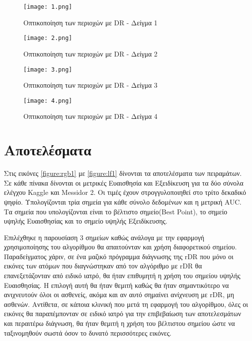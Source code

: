 

\begin{figure}[!h]
    \centering
      \texttt{[image: 1.png]} \caption{Οπτικοποίηση των περιοχών με DR - Δείγμα 1}
      \label{figure:viz1n}    
  \end{figure}

\begin{figure}[!h]
    \centering
      \texttt{[image: 2.png]} \caption{Οπτικοποίηση των περιοχών με DR - Δείγμα 2}
      \label{figure:viz2n}    
  \end{figure}

\begin{figure}[!h]
    \centering
      \texttt{[image: 3.png]} \caption{Οπτικοποίηση των περιοχών με DR - Δείγμα 3}
      \label{figure:viz3n}    
  \end{figure}

\begin{figure}[!h]
    \centering
      \texttt{[image: 4.png]} \caption{Οπτικοποίηση των περιοχών με DR - Δείγμα 4}
      \label{figure:viz4n}    
  \end{figure}

\section{Αποτελέσματα}
\label{sec:7.2}

Στις εικόνες \ref{figure:rgb1} με \ref{figure:lf1} δίνονται τα αποτελέσματα των πειραμάτων. Σε κάθε πίνακα δίνονται οι μετρικές Ευαισθησία και Εξειδίκευση για τα δύο σύνολα ελέγχου Kaggle και Messidor 2. Οι τιμές έχουν στρογγυλοποιηθεί στο τρίτο δεκαδικό ψηφίο. Υπολογίζονται τρία σημεία για κάθε σύνολο δεδομένων και η μετρική AUC. Τα σημεία που υπολογίζονται είναι το βέλτιστο σημείο(Best Point), το σημείο υψηλής Ευαισθησίας και το σημείο υψηλής Εξειδίκευσης.

Επιλέχθηκε η παρουσίαση 3 σημείων καθώς ανάλογα με την εφαρμογή χρησιμοποίησης του αλγορίθμου θα απαιτούνταν και χρήση διαφορετικού σημείου. Παραδείγματος χάριν, σε ένα μαζικό πρόγραμμα διάγνωσης της rDR που μόνο οι εικόνες των ατόμων που διαγνώστηκαν από τον αλγόριθμο με rDR θα επανεξετάζονταν από ειδικό ιατρό, θα ήταν επιθυμητή η χρήση του σημείου υψηλής Ευαισθησίας. Η επιλογή αυτή θα ήταν θεμιτή καθώς θα ήταν σημαντικότερο να ανιχνευτούν όλοι οι ασθενείς, ακόμα και αν αυτό σημαίνει ανίχνευση με rDR, μη ασθενών. Αντίθετα, σε κάποια κλινική που μετά τη εφαρμογή του αλγορίθμου, όλες οι εικόνες θα παραπέμπονταν σε ειδικό ιατρό για την επιβεβαίωση των αποτελεσμάτων και περαιτέρω διάγνωση, θα ήταν θεμιτή η χρήση του βέλτιστου σημείου ώστε να ταξινομηθούν σωστά όσον το δυνατό περισσότερες εικόνες.


